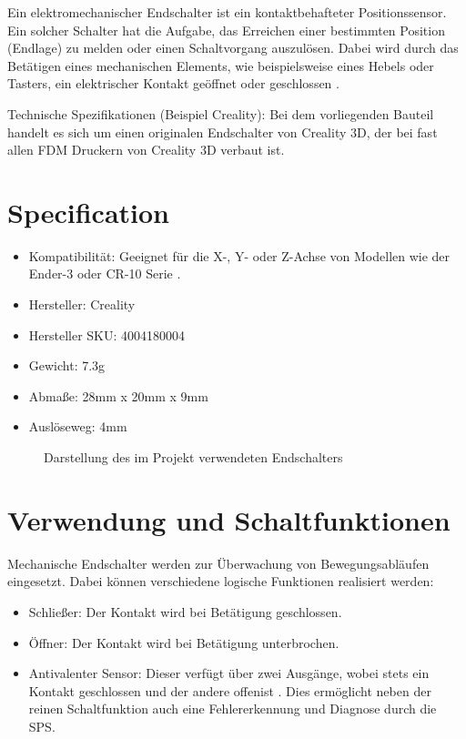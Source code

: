 Ein elektromechanischer Endschalter ist ein kontaktbehafteter Positionssensor. Ein solcher Schalter \glqq hat die Aufgabe, das Erreichen einer bestimmten Position (Endlage) zu melden oder einen Schaltvorgang auszulösen\grqq{}\cite[435]{Hering:2012}. Dabei wird durch das Betätigen eines mechanischen Elements, wie beispielsweise eines Hebels oder Tasters, ein elektrischer Kontakt geöffnet oder geschlossen \cite[120-122]{Hering:2012}.

Technische Spezifikationen (Beispiel Creality): Bei dem vorliegenden Bauteil handelt es sich um einen \glqq originalen Endschalter von Creality 3D, der bei fast allen FDM Druckern von Creality 3D verbaut ist\grqq{}\cite{3DJAKE:2026}.

\section{Specification}

\begin{itemize}
	\item Kompatibilität: Geeignet für die X-, Y- oder Z-Achse von Modellen wie der Ender-3 oder CR-10 Serie \cite{3DJAKE:2026}\cite{bastelgarage:2026}.
	\item Hersteller: Creality
	\item Hersteller SKU: 4004180004
	\item Gewicht: 7.3g
	\item Abmaße:   28mm x 20mm x 9mm
	\item Auslöseweg: 4mm
\end{itemize}

\begin{figure}[H]
	\centering
	
	\caption{Darstellung des im Projekt verwendeten Endschalters}
	\label{fig:limit_switch}
\end{figure}

\section{Verwendung und Schaltfunktionen}

Mechanische Endschalter werden zur Überwachung von Bewegungsabläufen eingesetzt. Dabei können verschiedene logische Funktionen realisiert werden:

\begin{itemize}
	\item Schließer: Der Kontakt wird bei Betätigung geschlossen.
	\item Öffner: Der Kontakt wird bei Betätigung unterbrochen.
	\item Antivalenter Sensor: Dieser verfügt über zwei Ausgänge, wobei \glqq stets ein Kontakt geschlossen und der andere offen\grqq{}ist \cite[435]{Hering:2012}. Dies ermöglicht neben der reinen Schaltfunktion auch eine \glqq Fehlererkennung und Diagnose durch die SPS\grqq{}\cite[435-436]{Hering:2012}.
\end{itemize}

